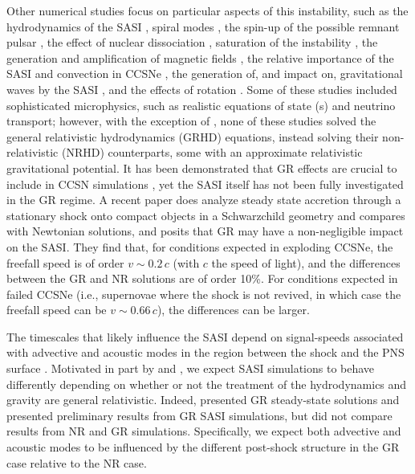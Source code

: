 Other numerical studies focus on particular aspects of this instability,
such as the hydrodynamics of the SASI
\citep{oky2006,sff2009,iny2014},
spiral modes
\citep{bs2007,iko2008,f2010},
the spin-up of the possible remnant pulsar
\citep{bm2007},
the effect of nuclear dissociation
\citep{ft2009},
saturation of the instability
\citep{gsf2010},
the generation and amplification of magnetic fields
\citep{ecb2010,ecb2012},
the relative importance of the SASI and convection in CCSNe
\citep{cb2015},
the generation of, and impact on, gravitational waves by the SASI
\citep{%
koy2007,
kio2009,
kkt2016,
a2017,
kkt2017,
amm2017,
oc2018b,
hkk2018,
amj2019,
mml2020,
mml2023,
dad2023},
and the effects of rotation
\citep{yy2005,yf2008,wft2023,bfg2023}.
Some of these studies included sophisticated microphysics, such as
realistic equations of state (\eos s) and neutrino transport;
however, with the exception of \citet{kkt2017},
none of these studies solved the general relativistic hydrodynamics (GRHD)
equations, instead solving their non-relativistic (NRHD) counterparts,
some with an approximate relativistic gravitational potential.
It has been demonstrated that GR effects are crucial to include in CCSN
simulations \citep{bdm2001,mjm2012,lmm2012,oc2018a}, yet the SASI itself
has not been fully investigated in the GR regime.
A recent paper \citep{kc2022} does analyze steady state accretion
through a stationary shock onto compact objects in a
Schwarzchild geometry and compares with Newtonian solutions, and posits
that GR may have a non-negligible impact on the SASI.
They find that, for conditions expected in exploding CCSNe,
the freefall speed is of order $v\sim0.2\,c$
(with $c$ the speed of light), and
the differences between the GR and NR solutions are of order 10\%.
For conditions expected in failed CCSNe (i.e., supernovae where the
shock is not revived, in which case the freefall speed can be
$v\sim0.66\,c$), the differences can be larger.

The timescales that likely influence the SASI depend on signal-speeds
associated with advective and acoustic modes in the region
between the shock and the PNS surface
\citep{bm2006,fgs2007,m2020}.
Motivated in part by \citet{dem2020} and \citet{kc2022},
we expect SASI simulations to behave differently depending
on whether or not the treatment of the hydrodynamics and gravity
are general relativistic.
Indeed, \citet{dem2020} presented GR steady-state solutions and
presented preliminary results from GR SASI simulations,
but did not compare results from NR and GR simulations.
Specifically, we expect both advective and acoustic modes to be
influenced by the different post-shock structure in the GR case
relative to the NR case.

